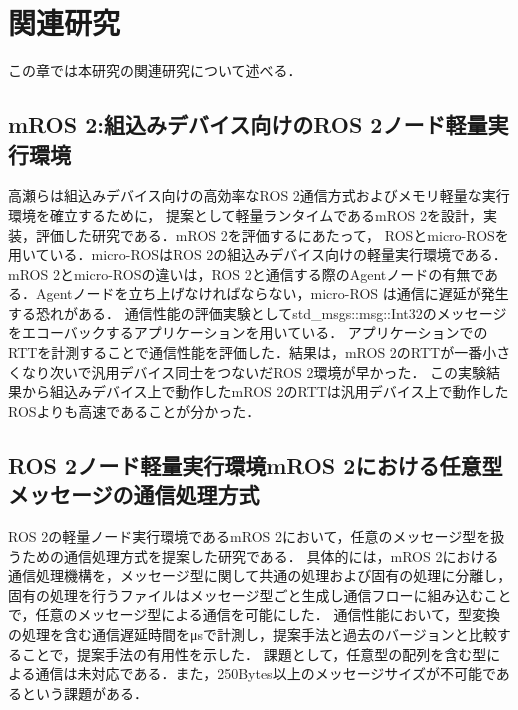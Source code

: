 \chapter{関連研究}
この章では本研究の関連研究について述べる．
\section{mROS 2:組込みデバイス向けのROS 2ノード軽量実行環境}
高瀬らは組込みデバイス向けの高効率なROS 2通信方式およびメモリ軽量な実行環境を確立するために，
提案として軽量ランタイムであるmROS 2を設計，実装，評価した研究である．mROS 2を評価するにあたって，
ROSとmicro-ROSを用いている．micro-ROSはROS 2の組込みデバイス向けの軽量実行環境である．
mROS 2とmicro-ROSの違いは，ROS 2と通信する際のAgentノードの有無である．Agentノードを立ち上げなければならない，micro-ROS は通信に遅延が発生する恐れがある．
通信性能の評価実験としてstd\_msgs::msg::Int32のメッセージをエコーバックするアプリケーションを用いている．
アプリケーションでのRTTを計測することで通信性能を評価した．結果は，mROS 2のRTTが一番小さくなり次いで汎用デバイス同士をつないだROS 2環境が早かった．
この実験結果から組込みデバイス上で動作したmROS 2のRTTは汎用デバイス上で動作したROSよりも高速であることが分かった．
\section{ROS 2ノード軽量実行環境mROS 2における任意型メッセージの通信処理方式}
ROS 2の軽量ノード実行環境であるmROS 2において，任意のメッセージ型を扱うための通信処理方式を提案した研究である．
具体的には，mROS 2における通信処理機構を，メッセージ型に関して共通の処理および固有の処理に分離し，固有の処理を行うファイルはメッセージ型ごと生成し通信フローに組み込むことで，任意のメッセージ型による通信を可能にした．
通信性能において，型変換の処理を含む通信遅延時間をμsで計測し，提案手法と過去のバージョンと比較することで，提案手法の有用性を示した．
課題として，任意型の配列を含む型による通信は未対応である．また，250Bytes以上のメッセージサイズが不可能であるという課題がある．